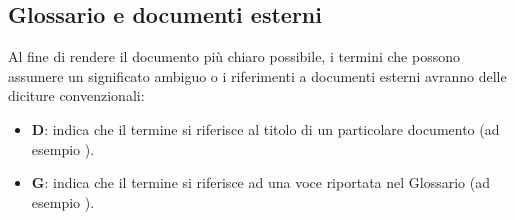 \subsection{Glossario e documenti esterni}
Al fine di rendere il documento più chiaro possibile, i termini che possono assumere un significato ambiguo o i riferimenti a documenti esterni
avranno delle diciture convenzionali:

\begin{itemize}
    \item \textbf{D}: indica che il termine si riferisce al titolo di un particolare documento (ad esempio \PdPd).
    \item \textbf{G}: indica che il termine si riferisce ad una voce riportata nel Glossario (ad esempio ).
\end{itemize}
